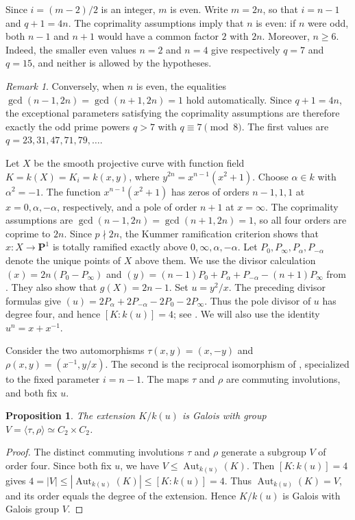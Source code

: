 \documentclass[11pt,reqno]{amsart}
\newtheorem{proposition}[theorem]{Proposition}
\theoremstyle{remark}
\newtheorem{remark}[theorem]{Remark}
\newcommand{\Aut}{\operatorname{Aut}}
\newcommand{\PP}{\mathbf{P}}
\begin{document}
Since $i=(m-2)/2$ is an integer, $m$ is even. Write $m=2n$, so that $i=n-1$ and $q+1=4n$. The coprimality assumptions imply that $n$ is even: if $n$ were odd, both $n-1$ and $n+1$ would have a common factor $2$ with $2n$. Moreover, $n\geq6$. Indeed, the smaller even values $n=2$ and $n=4$ give respectively $q=7$ and $q=15$, and neither is allowed by the hypotheses.

\begin{remark}
Conversely, when $n$ is even, the equalities $\gcd(n-1,2n)=\gcd(n+1,2n)=1$ hold automatically. Since $q+1=4n$, the exceptional parameters satisfying the coprimality assumptions are therefore exactly the odd prime powers $q>7$ with $q\equiv7\pmod{8}$. The first values are $q=23,31,47,71,79,\ldots$.
\end{remark}

Let $X$ be the smooth projective curve with function field $K=k(X)=K_i=k(x,y)$, where $y^{2n}=x^{n-1}(x^2+1)$.
Choose $\alpha\in k$ with $\alpha^2=-1$. The function $x^{n-1}(x^2+1)$ has zeros of orders $n-1,1,1$ at $x=0,\alpha,-\alpha$, respectively, and a pole of order $n+1$ at $x=\infty$. The coprimality assumptions are $\gcd(n-1,2n)=\gcd(n+1,2n)=1$, so all four orders are coprime to $2n$. Since $p\nmid2n$, the Kummer ramification criterion shows that $x:X\to\PP^1$ is totally ramified exactly above $0,\infty,\alpha,-\alpha$. Let $P_0,P_\infty,P_\alpha,P_{-\alpha}$ denote the unique points of $X$ above them. We use the divisor calculation $(x)=2n(P_0-P_\infty)$ and $(y)=(n-1)P_0+P_\alpha+P_{-\alpha}-(n+1)P_\infty$ from \cite[Equation~(3)]{BeelenMontanucciNiemannQuoos}.
They also show that $g(X)=2n-1$.
Set $u=y^2/x$. The preceding divisor formulas give $(u)=2P_\alpha+2P_{-\alpha}-2P_0-2P_\infty$.
Thus the pole divisor of $u$ has degree four, and hence $[K:k(u)]=4$; see \cite[Theorem~1.4.11]{Stichtenoth}. We will also use the identity $u^n=x+x^{-1}$.

Consider the two automorphisms $\tau(x,y)=(x,-y)$ and $\rho(x,y)=(x^{-1},y/x)$.
The second is the reciprocal isomorphism of \cite[Lemma~3.2]{BeelenMontanucciNiemannQuoos}, specialized to the fixed parameter $i=n-1$. The maps $\tau$ and $\rho$ are commuting involutions, and both fix $u$.

\begin{proposition}\label{prop:cover}
The extension $K/k(u)$ is Galois with group $V=\langle\tau,\rho\rangle\simeq C_2\times C_2$.
\end{proposition}

\begin{proof}
The distinct commuting involutions $\tau$ and $\rho$ generate a subgroup
$V$ of order four. Since both fix $u$, we have
$V\leq\Aut_{k(u)}(K)$. Then $[K:k(u)]=4$ gives
$4=|V|\leq|\Aut_{k(u)}(K)|\leq[K:k(u)]=4$.
Thus $\Aut_{k(u)}(K)=V$, and its order equals the degree of the
extension. Hence $K/k(u)$ is Galois with Galois group $V$.
\end{proof}
\end{document}
